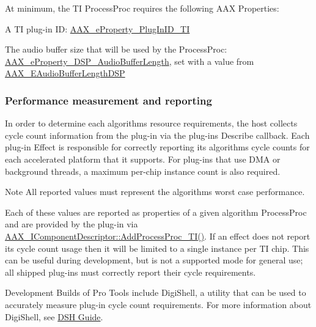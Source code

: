 At minimum, the T\+I Process\+Proc requires the following A\+A\+X Properties\+: 
\begin{DoxyItemize}
\item A T\+I plug-\/in I\+D\+: \hyperlink{a00283_a6571f4e41a5dd06e4067249228e2249ea75f174df4efbeca86eaada126c1d9214}{A\+A\+X\+\_\+e\+Property\+\_\+\+Plug\+In\+I\+D\+\_\+\+T\+I}  
\item The audio buffer size that will be used by the Process\+Proc\+: \hyperlink{a00283_a6571f4e41a5dd06e4067249228e2249ea09fbd1cbcae0e86ad81005258dc1b67e}{A\+A\+X\+\_\+e\+Property\+\_\+\+D\+S\+P\+\_\+\+Audio\+Buffer\+Length}, set with a value from \hyperlink{a00206_ab33e0f1ecf04ca4161fa8d8de5845d67}{A\+A\+X\+\_\+\+E\+Audio\+Buffer\+Length\+D\+S\+P}  
\end{DoxyItemize}

\hypertarget{a00362_subsection__performance_measurement_and_reporting}{}\subsubsection{Performance measurement and reporting}\label{a00362_subsection__performance_measurement_and_reporting}
In order to determine each algorithm\textquotesingle{}s resource requirements, the host collects cycle count information from the plug-\/in via the plug-\/in\textquotesingle{}s Describe callback. Each plug-\/in Effect is responsible for correctly reporting its algorithms\textquotesingle{} cycle counts for each accelerated platform that it supports. For plug-\/ins that use D\+M\+A or background threads, a maximum per-\/chip instance count is also required.

\begin{DoxyNote}{Note}
All reported values must represent the algorithm\textquotesingle{}s worst case performance.
\end{DoxyNote}
Each of these values are reported as properties of a given algorithm Process\+Proc and are provided by the plug-\/in via \hyperlink{a00088_aa8443e720e48046444a2e9f712f0864b}{A\+A\+X\+\_\+\+I\+Component\+Descriptor\+::\+Add\+Process\+Proc\+\_\+\+T\+I()}. If an effect does not report its cycle count usage then it will be limited to a single instance per T\+I chip. This can be useful during development, but is not a supported mode for general use; all shipped plug-\/ins must correctly report their cycle requirements.

Development Builds of Pro Tools include Digi\+Shell, a utility that can be used to accurately measure plug-\/in cycle count requirements. For more information about Digi\+Shell, see \hyperlink{a00365}{D\+S\+H Guide}.

